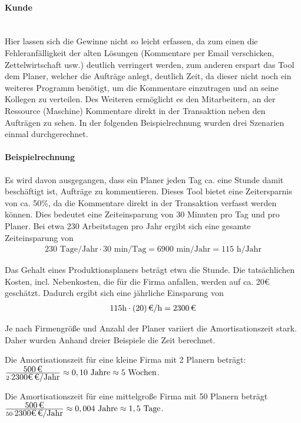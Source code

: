 \paragraph{Kunde}\mbox{} \\
Hier lassen sich die Gewinne nicht so leicht erfassen, da zum einen die Fehleranfälligkeit der alten Lösungen (Kommentare per Email verschicken, Zettelwirtschaft usw.) deutlich verringert werden, zum anderen erspart das Tool dem Planer, welcher die Aufträge anlegt, deutlich Zeit, da dieser nicht noch ein weiteres Programm benötigt, um die Kommentare einzutragen und an seine Kollegen zu verteilen. Des Weiteren ermöglicht es den Mitarbeitern, an der Ressource (Maschine) Kommentare direkt in der Transaktion neben den Aufträgen zu sehen. In der folgenden Beispielrechnung wurden drei Szenarien einmal durchgerechnet. 

\paragraph{Beispielrechnung}
Es wird davon ausgegangen, dass ein Planer jeden Tag ca. eine Stunde damit beschäftigt ist, Aufträge zu kommentieren. Dieses Tool bietet eine Zeitersparnis von ca. 50\%, da die Kommentare direkt in der Transaktion verfasst werden können. Dies bedeutet eine Zeiteinsparung von 30 Minuten pro Tag und pro Planer. Bei etwa 230 Arbeitstagen pro Jahr ergibt sich eine gesamte Zeiteinsparung von  
\begin{eqnarray}
230 \mbox{ Tage/Jahr} \cdot 30 \mbox{ min/Tag} = 6900 \mbox{ min/Jahr} = 115 \mbox{ h/Jahr} 
\end{eqnarray}

Das Gehalt eines Produktionsplaners beträgt etwa  die Stunde. Die tatsächlichen Kosten, incl. Nebenkosten, die für die Firma anfallen, werden auf ca. 20€ geschätzt. Dadurch ergibt sich eine jährliche Einsparung von 
\begin{eqnarray}
115 \mbox{h} \cdot \eur{(20)}{\mbox{/h}} = \eur{2300}
\end{eqnarray}

Je nach Firmengröße und Anzahl der Planer variiert die Amortisationszeit stark. Daher wurden Anhand dreier Beispiele die Zeit berechnet.

Die Amortisationszeit für eine kleine Firma mit 2 Planern beträgt:
$\frac{\eur{500}}{2 \cdot \eur{2300€} \mbox{/Jahr} } \approx 0,10 \mbox{ Jahre} \approx 5 \mbox{ Wochen}$.

Die Amortisationszeit für eine mittelgroße Firma mit 50 Planern beträgt
$\frac{\eur{500}}{50 \cdot \eur{2300€} \mbox{/Jahr} } \approx 0,004 \mbox{ Jahre} \approx 1,5 \mbox{ Tage}$.

